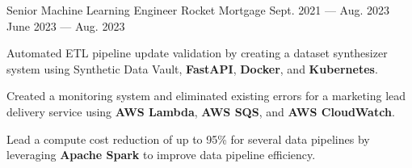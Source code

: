 
\vspace{-0.1cm}
\begin{cventries}
  \cventry
    {Senior Machine Learning Engineer} %
    {Rocket Mortgage} %
    {Sept. 2021 --- Aug. 2023} %
    {June 2023 --- Aug. 2023} %
    {
      \vspace{-0.1cm}
      \begin{cvitems} %
        \item Automated ETL pipeline update validation by creating a dataset synthesizer system using Synthetic Data Vault, \textbf{FastAPI}, \textbf{Docker}, and \textbf{Kubernetes}.
        \item Created a monitoring system and eliminated existing errors for a marketing lead delivery service using \textbf{AWS Lambda}, \textbf{AWS SQS}, and \textbf{AWS CloudWatch}.
        \item Lead a compute cost reduction of up to 95\% for several data pipelines by leveraging \textbf{Apache Spark} to improve data pipeline efficiency.
      \end{cvitems}
    }
  \vspace{-.2cm}


\end{cventries}

